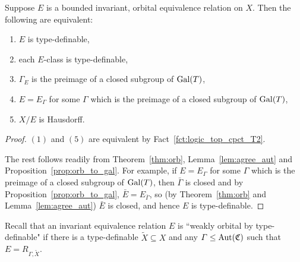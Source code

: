	\begin{thm}
		\label{thm:orb_aut}
		Suppose $E$ is a bounded invariant, orbital equivalence relation on $X$. Then the following are equivalent:
		\begin{enumerate}
			\item
			$E$ is type-definable,
			\item
			each $E$-class is type-definable,
			\item
			$\Gamma_E$ is the preimage of a closed subgroup of $\operatorname{{Gal}}(T)$,
			\item
			$E=E_\Gamma$ for some $\Gamma$ which is the preimage of a closed subgroup of $\operatorname{{Gal}}(T)$,
			\item
			$X/E$ is Hausdorff.
		\end{enumerate}
	\end{thm}
	\begin{proof}
		$(1)$ and $(5)$ are equivalent by Fact~\ref{fct:logic_top_cpct_T2}.
		
		The rest follows readily from Theorem~\ref{thm:orb}, Lemma~\ref{lem:agree_aut} and Proposition~\ref{prop:orb_to_gal}. For example, if $E=E_{\Gamma}$ for some $\Gamma$ which is the preimage of a closed subgroup of $\operatorname{{Gal}}(T)$, then $\bar \Gamma$ is closed and by Proposition~\ref{prop:orb_to_gal}, $\bar E=E_{\bar \Gamma}$, so (by Theorem~\ref{thm:orb} and Lemma~\ref{lem:agree_aut}) $\bar E$ is closed, and hence $E$ is type-definable.
	\end{proof}
	
	Recall that an invariant equivalence relation $E$ is ``weakly orbital by type-definable" if there is a type-definable $\tilde X\subseteq X$ and any $\Gamma\leq \operatorname{{Aut}}({\mathfrak C})$ such that $E=R_{\Gamma,\tilde X}$.
	
